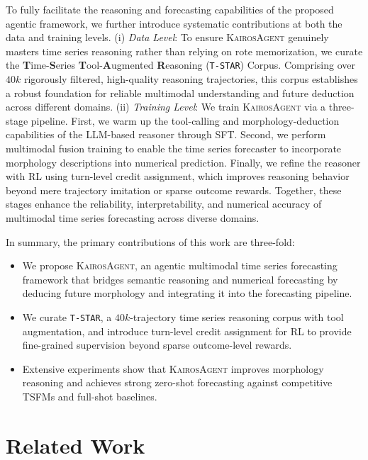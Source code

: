 \documentclass[11pt]{article}
\newcommand{\method}{\textsc{KairosAgent}\xspace}
\begin{document}
To fully facilitate the reasoning and forecasting capabilities of the proposed agentic framework, we further introduce systematic contributions at both the data and training levels.
(i) \textit{Data Level}:
To ensure \method genuinely masters time series reasoning rather than relying on rote memorization, we curate the \textbf{T}ime-\textbf{S}eries \textbf{T}ool-\textbf{A}ugmented \textbf{R}easoning (\texttt{T-STAR}) Corpus. 
Comprising over $40k$ rigorously filtered, high-quality reasoning trajectories, this corpus establishes a robust foundation for reliable multimodal understanding and future deduction across different domains.
(ii) \textit{Training Level}:
We train \method via a three-stage pipeline.
First, we warm up the tool-calling and morphology-deduction capabilities of the LLM-based reasoner through SFT.
Second, we perform multimodal fusion training to enable the time series forecaster to incorporate morphology descriptions into numerical prediction.
Finally, we refine the reasoner with RL using turn-level credit assignment, which improves reasoning behavior beyond mere trajectory imitation or sparse outcome rewards.
Together, these stages enhance the reliability, interpretability, and numerical accuracy of multimodal time series forecasting across diverse domains.

In summary, the primary contributions of this work are three-fold:
\begin{itemize}[leftmargin=3mm,noitemsep,topsep=0pt]
    \item We propose \method, an agentic multimodal time series forecasting framework that bridges semantic reasoning and numerical forecasting by deducing future morphology and integrating it into the forecasting pipeline.
    
    \item We curate \texttt{T-STAR}, a $40k$-trajectory time series reasoning corpus with tool augmentation, and introduce turn-level credit assignment for RL to provide fine-grained supervision beyond sparse outcome-level rewards.
    
    \item Extensive experiments show that \method improves morphology reasoning and achieves strong zero-shot forecasting against competitive TSFMs and full-shot baselines.
    
\end{itemize}

    
\section{Related Work}
\end{document}
